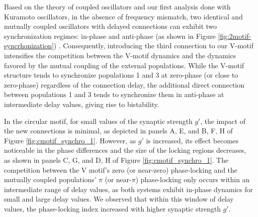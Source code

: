\documentclass[../main.tex]{subfiles}
\begin{document}
Based on the theory of coupled oscillators and our first analysis done with Kuramoto oscillators, in the absence of frequency mismatch, two identical and mutually coupled oscillators with delayed connections can exhibit two synchronization regimes: in-phase and anti-phase (as shown in Figure \ref{fig:2motif-syncrhonization}) \citep{d2008synchronization}.
Consequently, introducing the third connection to our V-motif intensifies the competition between the V-motif dynamics and the dynamics favored by the mutual coupling of the external populations.
While the V-motif structure tends to synchronize populations 1 and 3 at zero-phase (or close to zero-phase) regardless of the connection delay, the additional direct connection between populations 1 and 3 tends to synchronize them in anti-phase at intermediate delay values, giving rise to bistability.

In the circular motif, for small values of the synaptic strength $g'$, the impact of the new connections is minimal, as depicted in panels A, E, and B, F, H of Figure \ref{fig:cmotif_synchro_1}.
However, as $g'$ is increased, its effect becomes noticeable in the phase differences and the size of the locking regions decreases, as shown in panels C, G, and D, H of Figure \ref{fig:cmotif_synchro_1}.
The competition between the V motif's zero (or near-zero) phase-locking and the mutually coupled populations' $\pi$ (or near-$\pi$) phase-locking only occurs within an intermediate range of delay values, as both systems exhibit in-phase dynamics for small and large delay values.
We observed that within this window of delay values, the phase-locking index increased with higher synaptic strength $g'$. %
\end{document}
